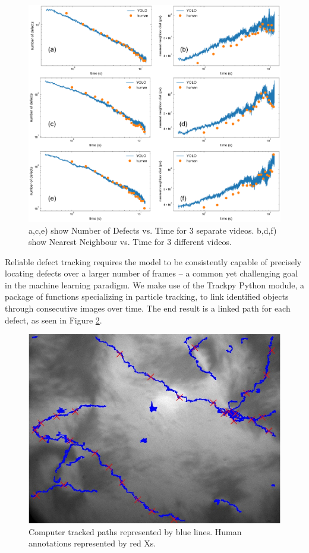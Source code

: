 \documentclass[prl,reprint,showpacs,floatfix,nofootinbib]{revtex4-1}
\begin{document}
\begin{figure}
  \includegraphics[width=\linewidth]{humanVmachineAllR.png}
  \caption{a,c,e) show Number of Defects vs. Time for 3 separate videos. b,d,f) show Nearest Neighbour vs. Time for 3 different videos.}
  \label{fig:HumanVMachine}
\end{figure}

Reliable defect tracking requires the model to be consistently capable of precisely locating defects over a larger number of frames -- a common yet challenging goal in the machine learning paradigm. We make use of the Trackpy Python module, a package of functions specializing in particle tracking, to link identified objects through consecutive images over time. The end result is a linked path for each defect, as seen in Figure \ref{fig:tracks}.

\begin{figure}
  \includegraphics[width=\linewidth]{track.jpg}
  \caption{Computer tracked paths represented by blue lines. Human annotations represented by red Xs.}
  \label{fig:tracks}
\end{figure}
\end{document}
